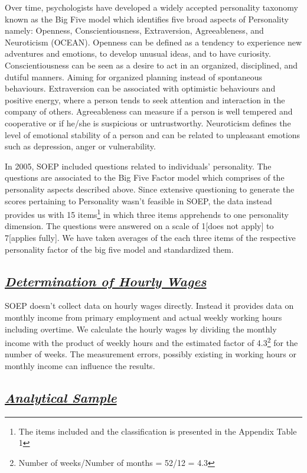 \documentclass[11pt, a4paper, leqno]{article}
\begin{document}
Over time, psychologists have developed a widely accepted personality taxonomy known as the Big Five model which identifies five broad aspects of Personality namely: Openness, Conscientiousness, Extraversion, Agreeableness, and Neuroticism 
(OCEAN). Openness can be defined as a tendency to experience new adventures and emotions, to develop unusual ideas, and to have curiosity. Conscientiousness can be seen as a desire to act in an organized, disciplined, and dutiful manners. Aiming for organized planning instead of spontaneous behaviours. Extraversion can be associated with optimistic behaviours and positive energy, where a person tends to seek attention and interaction in the company of others. Agreeableness can measure if a person is well tempered and cooperative or if he/she is suspicious or untrustworthy. Neuroticism defines the level of emotional stability of a person and can be related to unpleasant emotions such as depression, anger or vulnerability. \par
In 2005, SOEP included questions related to individuals’ personality. The questions are associated to the Big Five Factor model which comprises of the personality aspects described above. Since extensive questioning to generate the scores pertaining to Personality wasn’t feasible in SOEP, the data instead provides us with 15 items\footnote{The items included and the classification is presented in the Appendix Table 1} in which three items apprehends to one personality dimension. The questions were answered on a scale of 1[does not apply] to 7[applies fully]. We have taken averages of the each three items of the respective personality factor of the big five model and standardized them. 

\subsection*{\textit{\underline{Determination of Hourly Wages }}}

SOEP doesn’t collect data on hourly wages directly. Instead it provides data on monthly income from primary employment and actual weekly working hours including overtime. We calculate the hourly wages by dividing the monthly income with the product of weekly hours and the estimated factor of 4.3\footnote{Number of weeks/Number of months = 52/12 = 4.3} for the number of weeks. The measurement errors, possibly existing in working hours or monthly income can influence the results. 

\subsection*{\textit{\underline{Analytical Sample}}}
\end{document}
